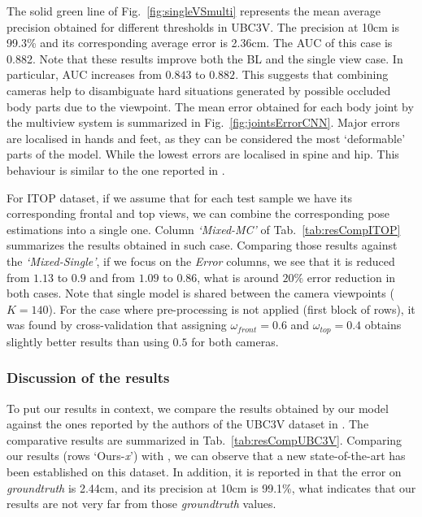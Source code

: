 \documentclass[review,12pt,3p]{elsarticle}
\begin{document}
The solid green line of Fig.~\ref{fig:singleVSmulti} represents the mean average precision obtained for different thresholds in UBC3V. 
The precision at 10cm is 99.3\% and its corresponding average error is 2.36cm. 
The AUC of this case is 0.882.
Note that these results improve both the BL and the single view case. In particular, AUC increases from $0.843$ to $0.882$. This suggests that combining cameras help to disambiguate hard situations generated by possible occluded body parts due to the viewpoint.
The mean error obtained for each body joint by the multiview system is summarized in Fig.~\ref{fig:jointsErrorCNN}. Major errors are localised in hands and feet, as they can be considered the most `deformable' parts of the model. While the lowest errors are localised in spine and hip. This behaviour is similar to the one reported in \citep{Shafaei16}.



For ITOP dataset, if we assume that for each test sample we have its corresponding frontal and top views, we can combine the corresponding pose estimations into a single one. Column \textit{`Mixed-MC'} of Tab.~\ref{tab:resCompITOP} summarizes the results obtained in such case. Comparing those results against the \textit{`Mixed-Single'}, if we focus on the \textit{Error} columns, we see that it is reduced from $1.13$ to $0.9$ and from $1.09$ to $0.86$, what is around $20\%$ error reduction in both cases. Note that single model is shared between the camera viewpoints ($K=140$).
For the case where pre-processing is not applied (first block of rows), it was found by cross-validation that assigning $\omega_{front}=0.6$ and $\omega_{top}=0.4$ obtains slightly better results than using $0.5$ for both cameras.
 
\subsubsection{Discussion of the results}
To put our results in context, we compare the results obtained by our model against the ones reported by the authors of the UBC3V dataset in \citep{Shafaei16}. The comparative results are summarized in Tab.~\ref{tab:resCompUBC3V}. 
Comparing our results (rows `Ours-\textit{x}') with \citep{Shafaei16}, we can observe that a new state-of-the-art has been established on this dataset.
In addition, it is reported in \citep{Shafaei16} that the error on \textit{groundtruth} is 2.44cm, and its precision at 10cm is 99.1\%, what indicates that our results are not very far from those \textit{groundtruth} values.
\end{document}
